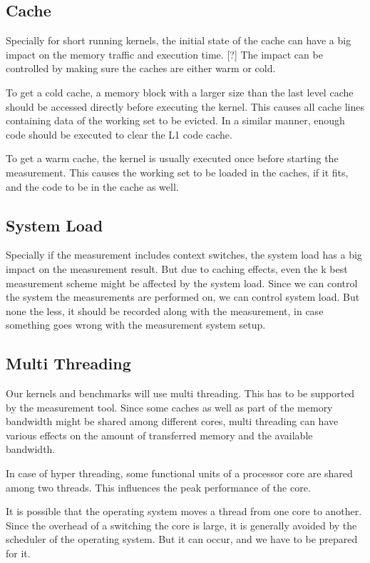 \documentclass[a4paper,12pt]{article}
\begin{document}
\subsection{Cache}
Specially for short running kernels, the initial state of the cache can have a big impact on the memory traffic and execution time. [?] The impact can be controlled by making sure the caches are either warm or cold.

To get a cold cache, a memory block with a larger size than the last level cache should be accessed directly before executing the kernel. This causes all cache lines containing data of the working set to be evicted. In a similar manner, enough code should be executed to clear the L1 code cache.

To get a warm cache, the kernel is usually executed once before starting the measurement. This causes the working set to be loaded in the caches, if it fits, and the code to be in the cache as well.

\subsection{System Load}
Specially if the measurement includes context switches, the system load has a big impact on the measurement result. But due to caching effects, even the k best measurement scheme might be affected by the system load. Since we can control the system the measurements are performed on, we can control system load. But none the less, it should be recorded along with the measurement, in case something goes wrong with the measurement system setup.

\subsection{Multi Threading}
Our kernels and benchmarks will use multi threading. This has to be supported by the measurement tool. Since some caches as well as part of the memory bandwidth might be shared among different cores, multi threading can have various effects on the amount of transferred memory and the available bandwidth.

In case of hyper threading, some functional units of a processor core are shared among two threads. This influences the peak performance of the core.

It is possible that the operating system moves a thread from one core to another. Since the overhead of a switching the core is large, it is generally avoided by the scheduler of the operating system. But it can occur, and we have to be prepared for it.
\end{document}
